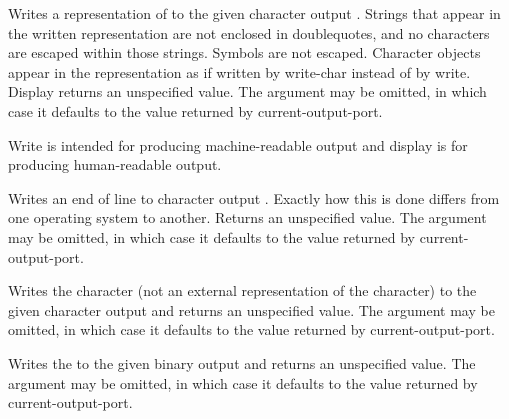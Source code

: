 \begin{entry}{%
}

Writes a representation of  to the given character output .
Strings that appear in the written representation are not enclosed in
doublequotes, and no characters are escaped within those strings.  
Symbols are not escaped.  Character
objects appear in the representation as if written by {\cf write-char}
instead of by {\cf write}.  {\cf Display} returns an unspecified value.
The  argument may be omitted, in which case it defaults to the
value returned by {\cf current-output-port}.

\begin{rationale}
{\cf Write} is intended
for producing mach\-ine-readable output and {\cf display} is for producing
human-readable output.  
\end{rationale}
\end{entry}


\begin{entry}{%
}

Writes an end of line to character output .  Exactly how this
is done differs
from one operating system to another.  Returns an unspecified value.
The  argument may be omitted, in which case it defaults to the
value returned by {\cf current-output-port}.

\end{entry}


\begin{entry}{%
}

Writes the character  (not an external representation of the
character) to the given character output  and returns an unspecified
value.  The
 argument may be omitted, in which case it defaults to the value
returned by {\cf current-output-port}.

\end{entry}

\begin{entry}{%
}

Writes the  to
the given binary output  and returns an unspecified value.
The  argument may be omitted, in which case it defaults to
the value returned by {\cf current-output-port}.

\end{entry}

